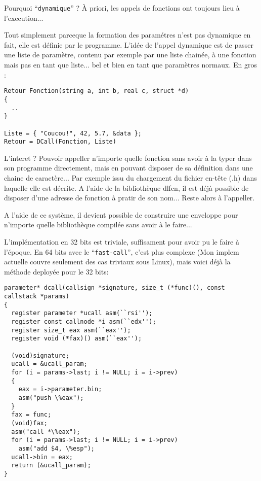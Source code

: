 \documentclass[a5paper, 12pt]{book}
\begin{document}
Pourquoi ``\verb!dynamique!'' ? \`A priori, les appels de fonctions
ont toujours lieu à l'execution...

Tout simplement parceque la formation des paramétres n'est
pas dynamique en fait, elle est définie par le programme.
L'idée de l'appel dynamique est de passer une liste de
paramètre, contenu par exemple par une liste chainée, à une
fonction mais pas en tant que liste... bel et bien en tant
que paramètres normaux. En gros :\\

\begin{verbatim}
Retour Fonction(string a, int b, real c, struct *d)
{
  ..
}

Liste = { "Coucou!", 42, 5.7, &data };
Retour = DCall(Fonction, Liste)
\end{verbatim}

L'interet ? Pouvoir appeller n'importe quelle fonction
sans avoir à la typer dans son programme directement,
mais en pouvant disposer de sa définition dans une chaine
de caractère... Par exemple issu du chargement du fichier
en-tête (.h) dans laquelle elle est décrite.
A l'aide de la bibliothèque dlfcn, il est déjà possible
de disposer d'une adresse de fonction à pratir de son
nom... Reste alors à l'appeller.

A l'aide de ce système, il devient possible de construire
une enveloppe pour n'importe quelle bibliothèque compilée
sans avoir à le faire...

L'implémentation en 32 bits est triviale, suffisament pour
avoir pu le faire à l'époque. En 64 bits avec le ``\verb!fast-call!'',
c'est plus complexe (Mon implem actuelle couvre seulement des cas
triviaux sous Linux), mais voici déjà la méthode deployée
pour le 32 bits:\\

\begin{verbatim}
parameter* dcall(callsign *signature, size_t (*func)(), const callstack *params)
{
  register parameter *ucall asm(``rsi'');
  register const callnode *i asm(``edx'');
  register size_t eax asm(``eax'');
  register void (*fax)() asm(``eax'');

  (void)signature;
  ucall = &ucall_param;
  for (i = params->last; i != NULL; i = i->prev)
  {
    eax = i->parameter.bin;
    asm("push \%eax");
  }
  fax = func;
  (void)fax;
  asm("call *\%eax");
  for (i = params->last; i != NULL; i = i->prev)
    asm("add $4, \%esp");
  ucall->bin = eax;
  return (&ucall_param);
}
\end{verbatim}
\end{document}
